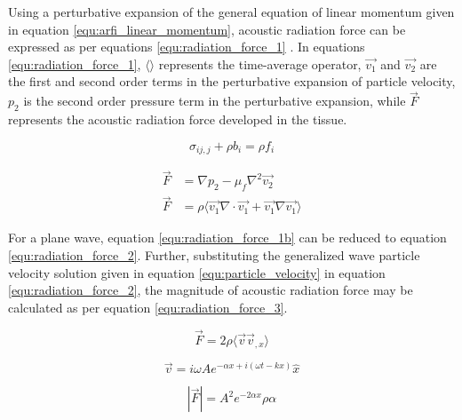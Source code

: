 			Using a perturbative expansion of the general equation of linear momentum given in equation \ref{equ:arfi_linear_momentum}, acoustic radiation force can be expressed as per equations \ref{equ:radiation_force_1} \cite{nyborg65}. In equations \ref{equ:radiation_force_1}, $\langle\rangle$ represents the time-average operator, $\vec{v_1}$ and $\vec{v_2}$ are the first and second order terms in the perturbative expansion of particle velocity, $p_2$ is the second order pressure term in the perturbative expansion, while $\vec{F}$ represents the acoustic radiation force developed in the tissue.

			\begin{equation}
				\label{equ:arfi_linear_momentum}
				\sigma_{ij,j} + \rho b_i = \rho f_i
			\end{equation}

			\begin{subequations}
				\label{equ:radiation_force_1}
				\begin{align}
					\vec{F} &= \nabla p_2 - \mu_f \nabla^2 \vec{v_2} \label{equ:radiation_force_1a} \\
					\vec{F} &= \rho \langle\vec{v_1}\nabla\cdot\vec{v_1} + \vec{v_1}\nabla\vec{v_1}\rangle \label{equ:radiation_force_1b}
				\end{align}
			\end{subequations}

			For a plane wave, equation \ref{equ:radiation_force_1b} can be reduced to equation \ref{equ:radiation_force_2}. Further, substituting the generalized wave particle velocity solution given in equation \ref{equ:particle_velocity} in equation \ref{equ:radiation_force_2}, the magnitude of acoustic radiation force may be calculated as per equation \ref{equ:radiation_force_3}.

			\begin{equation}
				\label{equ:radiation_force_2}
				\vec{F} = 2\rho\langle \vec{v} \vec{v}_{,x} \rangle
			\end{equation}

			\begin{equation}
				\label{equ:particle_velocity}
				\vec{v} = i\omega A e^{-\alpha x + i\left(\omega t - k x\right)}\hat{x}
			\end{equation}

			\begin{equation}
				\label{equ:radiation_force_3}
				\left|\vec{F}\right| = A^2 e^{-2\alpha x}\rho\alpha
			\end{equation}

